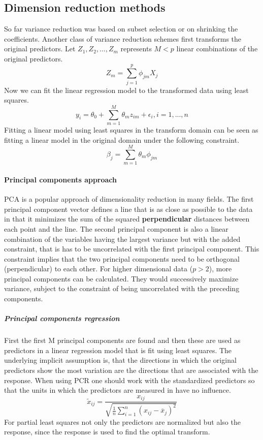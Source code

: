 \documentclass[../document.tex]{subfiles}
\begin{document}
	\subsection{Dimension reduction methods}
	So far variance reduction was based on subset selection or on shrinking the coefficients. Another class of variance reduction schemes first transforms the original predictors. Let \(Z_{1},Z_{2},...,Z_{m}\) represents \(M<p\) linear combinations of the original predictors.
	\begin{equation}
		Z_{m}=\sum_{j=1}^{p}\phi_{jm}X_{j}
	\end{equation}
	Now we can fit the linear regression model to the transformed data using least squares.
	\begin{equation}
		y_{i}=\theta_{0}+\sum_{m=1}^{M}\theta_{m}z_{im}+\epsilon_{i}, i=1,...,n
	\end{equation}
	Fitting a linear model using least squares in the transform domain can be seen as fitting a linear model in the original domain under the following constraint.
	\begin{equation}
		\beta_{j}=\sum_{m=1}^{M}\theta_{m}\phi_{jm}
	\end{equation}
	\paragraph{Principal components approach}
	PCA is a popular approach of dimensionality reduction in many fields. The first principal component vector defines a line that is as close as possible to the data in that it minimizes the sum of the squared \textbf{perpendicular} distances between each point and the line. The second principal component is also a linear combination of the variables having the largest variance but with the added constraint, that is has to be uncorrelated with the first principal component. This constraint implies that the two principal components need to be orthogonal (perpendicular) to each other. For higher dimensional data (\(p>2\)), more principal components can be calculated. They would successively maximize variance, subject to the constraint of being uncorrelated with the preceding components.
	\subparagraph{Principal components regression}
	First the first M principal components are found and then these are used as predictors in a linear regression model that is fit using least squares. The underlying implicit assumption is, that the directions in which the original predictors show the most variation are the directions that are associated with the response. When using PCR one should work with the standardized predictors so that the units in which the predictors are measured in have no influence.
	\begin{equation}
		\tilde{x}_{ij}=\frac{x_{ij}}{\sqrt{\frac{1}{n}\sum_{i=1}^{n}(x_{ij}-\overline{x}_{j})^2}}
	\end{equation}
	For partial least squares not only the predictors are normalized but also the response, since the response is used to find the optimal transform.
\end{document}
